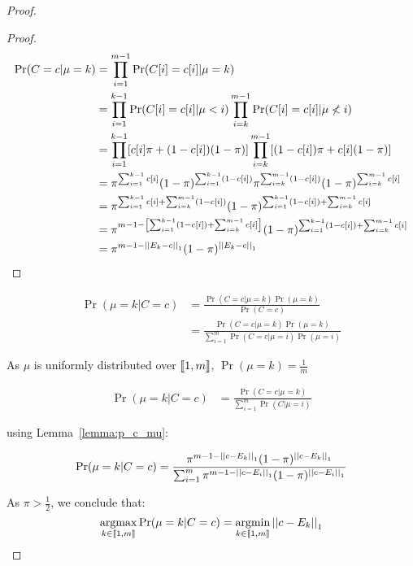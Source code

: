 \begin{proof}
\begin{proof}
    \begin{align}
        \Pr(C = c| \mu = k)
        &= \prod_{i = 1}^{m -1} \Pr(C[i] = c[i] | \mu = k)\\
        &= \prod_{i = 1}^{k-1} \Pr(C[i] = c[i] | \mu < i) \prod_{i = k}^{m-1} \Pr(C[i] = c[i] | \mu \not< i)\\
        &= \prod_{i = 1}^{k-1} [c[i] \pi + (1 - c[i]) (1 - \pi)] \prod_{i = k}^{m-1} [(1 - c[i]) \pi + c[i] (1 - \pi)]\\
        &= \pi^{\sum_{i = 1}^{k-1} c[i]} (1 - \pi)^{\sum_{i = 1}^{k-1} (1 - c[i])} \pi^{\sum_{i = k}^{m-1} (1 - c[i])} (1 - \pi)^{\sum_{i = k}^{m-1} c[i]}\\
        &= \pi^{\sum_{i = 1}^{k-1} c[i] + \sum_{i = k}^{m-1} (1 - c[i])} (1 - \pi)^{\sum_{i = 1}^{k-1} (1 - c[i]) + \sum_{i = k}^{m-1} c[i]} \\
        &= \pi^{m - 1 - \left[\sum_{i = 1}^{k-1} (1 - c[i]) + \sum_{i = k}^{m -1} c[i] \right]} (1 - \pi)^{\sum_{i = 1}^{k-1} (1 - c[i]) + \sum_{i = k}^{m-1} c[i]}\\
        &= \pi^{m - 1 - \left|\left|E_k - c\right|\right|_1} (1 - \pi)^{\left|\left|E_k - c\right|\right|_1}
    \end{align}
\end{proof}


\begin{align}
    \Pr(\mu = k | C = c) 
    &= \frac{\Pr(C = c | \mu = k) \Pr(\mu = k)}{\Pr(C=c)}\\
    &= \frac{\Pr(C = c | \mu = k) \Pr(\mu = k)}{\sum_{i = 1}^m \Pr(C = c | \mu = i) \Pr(\mu = i)}
\end{align}

As $\mu$ is uniformly distributed over $\left\llbracket1, m\right\rrbracket$, $\Pr(\mu = k) = \frac{1}{m}$

\begin{align}
    \Pr(\mu = k | C = c) 
    &= \frac{\Pr(C = c| \mu = k)}{\sum_{i = 1}^m \Pr(C | \mu = i)}
\end{align}

using Lemma~\ref{lemma:p_c_mu}:

\begin{align}
    \Pr(\mu = k | C = c)
    &= \frac{\pi^{m - 1 - \left|\left|c - E_k\right|\right|_1} (1 - \pi)^{\left|\left|c - E_k\right|\right|_1}}{\sum_{i = 1}^m \pi^{m - 1 - \left|\left|c - E_i\right|\right|_1} (1 - \pi)^{\left|\left|c - E_i\right|\right|_1}}\\
\end{align}

As $\pi > \frac{1}{2}$, we conclude that:
\[\operatorname*{argmax}_{k \in \left\llbracket1, m\right\rrbracket} \Pr(\mu = k | C = c) = \operatorname*{argmin}_{k \in \left\llbracket1, m\right\rrbracket} \left|\left|c - E_k\right|\right|_1\]
\end{proof}


